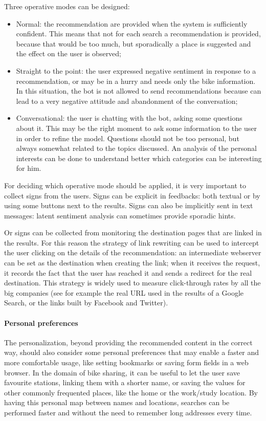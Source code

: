 Three operative modes can be designed:

\begin{itemize}
	\item Normal: the recommendation are provided when the system is sufficiently confident. This means that not for each search a recommendation is provided, because that would be too much, but sporadically a place is suggested and the effect on the user is observed;

	\item Straight to the point: the user expressed negative sentiment in response to a recommendation, or may be in a hurry and needs only the bike information. In this situation, the bot is not allowed to send recommendations because can lead to a very negative attitude and abandonment of the conversation;

	\item Conversational: the user is chatting with the bot, asking some questions about it. This may be the right moment to ask some information to the user in order to refine the model. Questions should not be too personal, but always somewhat related to the topics discussed. An analysis of the personal interests can be done to understand better which categories can be interesting for him.
\end{itemize}

For deciding which operative mode should be applied, it is very important to collect signs from the users. Signs can be explicit in feedbacks: both textual or by using some buttons next to the results. Signs can also be implicitly sent in text messages: latent sentiment analysis can sometimes provide sporadic hints.

Or signs can be collected from monitoring the destination pages that are linked in the results. For this reason the strategy of link rewriting can be used to intercept the user clicking on the details of the recommendation: an intermediate webserver can be set as the destination when creating the link; when it receives the request, it records the fact that the user has reached it and sends a redirect for the real destination. This strategy is widely used to measure click-through rates by all the big companies (see for example the real URL used in the results of a Google Search, or the links built by Facebook and Twitter).

\paragraph{Personal preferences}
The personalization, beyond providing the recommended content in the correct way, should also consider some personal preferences that may enable a faster and more comfortable usage, like setting bookmarks or saving form fields in a web browser. In the domain of bike sharing, it can be useful to let the user save favourite stations, linking them with a shorter name, or saving the values for other commonly frequented places, like the home or the work/study location. By having this personal map between names and locations, searches can be performed faster and without the need to remember long addresses every time.

